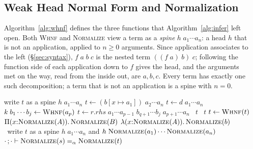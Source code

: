 \documentclass[acmsmall,screen,nonacm]{acmart}
\newcommand{\tPi}[3]{\Pi(#1{:}#2).\,#3}
\newcommand{\tLam}[3]{\lambda(#1{:}#2).\,#3}
\newcommand{\subst}[3]{#1[#2 \mapsto #3]}
\newcommand{\alphaeq}{=_{\alpha}}
\begin{document}
\subsection{Weak Head Normal Form and Normalization}
\label{sec:whnf}

Algorithm~\ref{alg:whnf} defines the three functions that Algorithm~\ref{alg:infer} left open.
Both \textsc{Whnf} and \textsc{Normalize} view a term as a \emph{spine} $h\;a_1 \cdots a_n$: a head $h$ that is not an application, applied to $n \ge 0$ arguments.
Since application associates to the left (\S\ref{sec:syntax}), $f\;a\;b\;c$ is the nested term $((f\;a)\;b)\;c$;
following the function side of each application down to $f$ gives the head, and the arguments met on the way, read from the inside out, are $a, b, c$.
Every term has exactly one such decomposition; a term that is not an application is a spine with $n = 0$.

\begin{algorithm}[ht]
\footnotesize
\caption{Weak head normalization with $\beta$, $\delta$, and $\iota$; full normalization; and definitional equality.}
\label{alg:whnf}
\begin{algorithmic}[1]
  \Loop
    \State write $t$ as a spine $h\;a_1 \cdots a_n$
    \If{$h = \tLam{x}{A}{b}$ and $n \ge 1$} \Comment{$\beta$}
      \State $t \gets (\subst{b}{x}{a_1})\;a_2 \cdots a_n$
     \Comment{$\delta$}
      \State $t \gets d\;a_1 \cdots a_n$
     \Comment{$\iota$}
      \State $k\;b_1 \cdots b_j \gets \Call{Whnf}{a_p}$
        \State $t \gets r.\mathit{rhs}\;a_1 \cdots a_{p-1}\;b_{q+1} \cdots b_j\;a_{p+1} \cdots a_n$
      \Else\ \Return $t$ 
      \EndIf
    \Else\ \Return $t$
    \EndIf
  \EndLoop
\EndFunction
\Statex
{}
  \State $t \gets \Call{Whnf}{t}$
  \If{$t = \tPi{x}{A}{B}$} \Return $\tPi{x}{\Call{Normalize}{A}}{\Call{Normalize}{B}}$
  \ElsIf{$t = \tLam{x}{A}{b}$} \Return $\tLam{x}{\Call{Normalize}{A}}{\Call{Normalize}{b}}$
  \Else\ write $t$ as a spine $h\;a_1 \cdots a_n$ and \Return $h\;\Call{Normalize}{a_1} \cdots \Call{Normalize}{a_n}$
  \EndIf
\EndFunction
\Statex
{}
  \State \Return $\cdot\,;\cdot \vdash \Call{Normalize}{s} \alphaeq \Call{Normalize}{t}$ 
\EndFunction
\end{algorithmic}
\end{algorithm}
\end{document}
